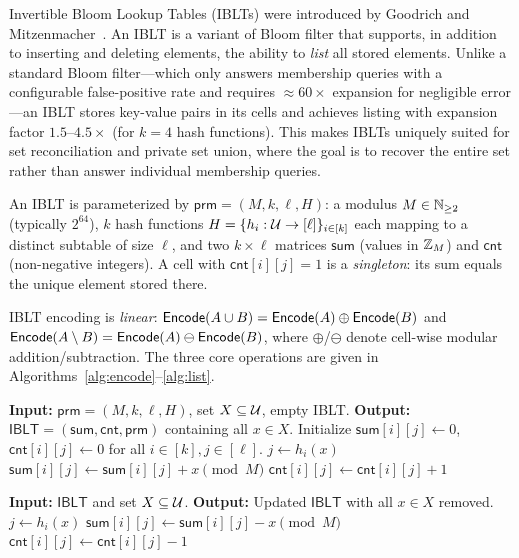 Invertible Bloom Lookup Tables (IBLTs) were introduced by Goodrich and
Mitzenmacher~\cite{GM11}. An IBLT is a variant of Bloom filter that supports,
in addition to inserting and deleting elements, the ability to \emph{list} all
stored elements. Unlike a standard Bloom filter---which only answers membership
queries with a configurable false-positive rate and requires $\approx 60\times$
expansion for negligible error---an IBLT stores key-value pairs in its cells
and achieves listing with expansion factor $1.5$--$4.5\times$ (for $k = 4$ hash
functions). This makes IBLTs uniquely suited for set reconciliation and private
set union, where the goal is to recover the entire set rather than answer
individual membership queries.

An IBLT is parameterized by $\mathsf{prm} = (M, k, \ell, H)$: a modulus $M \in
\mathbb{N}_{\geq 2}$ (typically $2^{64}$), $k$ hash functions $H = \{h_i : \mathcal{U} \to
[\ell]\}_{i \in [k]}$ each mapping to a distinct subtable of size $\ell$, and
two $k \times \ell$ matrices $\mathsf{sum}$ (values in $\mathbb{Z}_M$) and
$\mathsf{cnt}$ (non-negative integers). A cell with $\mathsf{cnt}[i][j] = 1$
is a \emph{singleton}: its sum equals the unique element stored there.

IBLT encoding is \emph{linear}: $\mathsf{Encode}(A \cup B) = \mathsf{Encode}(A) \oplus
\mathsf{Encode}(B)$ and $\mathsf{Encode}(A \setminus B) = \mathsf{Encode}(A) \ominus \mathsf{Encode}(B)$,
where $\oplus$/$\ominus$ denote cell-wise modular addition/subtraction.
The three core operations are given in
Algorithms~\ref{alg:encode}--\ref{alg:list}.

\begin{algorithm}[ht]
\caption{$\Encode_{\mathsf{prm}}(X)$ --- IBLT encoding.}
\label{alg:encode}
\begin{algorithmic}
\STATE \textbf{Input:} $\mathsf{prm} = (M, k, \ell, H)$, set $X \subseteq \mathcal{U}$, empty IBLT.
\STATE \textbf{Output:} $\mathsf{IBLT} = (\mathsf{sum}, \mathsf{cnt}, \mathsf{prm})$ containing all $x \in X$.
\STATE Initialize $\mathsf{sum}[i][j] \leftarrow 0$, $\mathsf{cnt}[i][j] \leftarrow 0$ for all $i \in [k], j \in [\ell]$.
    \STATE $j \leftarrow h_i(x)$
    \STATE $\mathsf{sum}[i][j] \leftarrow \mathsf{sum}[i][j] + x \pmod M$
    \STATE $\mathsf{cnt}[i][j] \leftarrow \mathsf{cnt}[i][j] + 1$
  \ENDFOR
\ENDFOR
\end{algorithmic}
\end{algorithm}

\begin{algorithm}[ht]
\caption{$\DeleteSet_{\mathsf{prm}}(\mathsf{IBLT}, X)$ --- batch deletion.}
\label{alg:deleteset}
\begin{algorithmic}
\STATE \textbf{Input:} $\mathsf{IBLT}$ and set $X \subseteq \mathcal{U}$.
\STATE \textbf{Output:} Updated $\mathsf{IBLT}$ with all $x \in X$ removed.
    \STATE $j \leftarrow h_i(x)$
    \STATE $\mathsf{sum}[i][j] \leftarrow \mathsf{sum}[i][j] - x \pmod M$
    \STATE $\mathsf{cnt}[i][j] \leftarrow \mathsf{cnt}[i][j] - 1$
  \ENDFOR
\ENDFOR
\end{algorithmic}
\end{algorithm}

